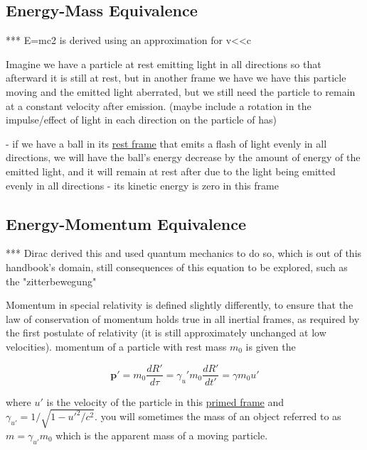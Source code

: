 \subsection{Energy-Mass Equivalence}

*** E=mc2 is derived using an approximation for v<<c

Imagine we have a particle at rest emitting light in all directions so that afterward it is still at rest, but in another frame we have we have this particle moving and the emitted light aberrated, but we still need the particle to remain at a constant velocity after emission. (maybe include a rotation in the impulse/effect of light in each direction on the particle of has)

- if we have a ball in its \hyperlink{def-proper-frame}{rest frame} that emits a flash of light evenly in all directions, we will have the ball's energy decrease by the amount of energy of the emitted light, and it will remain at rest after due to the light being emitted evenly in all directions
- its kinetic energy is zero in this frame

\subsection{Energy-Momentum Equivalence}

*** Dirac derived this and used quantum mechanics to do so, which is out of this handbook's domain, still consequences of this equation to be explored, such as the "zitterbewegung"

Momentum in special relativity is defined slightly differently, to ensure that the law of conservation of momentum holds true in all inertial frames, as required by the first postulate of relativity (it is still approximately unchanged at low velocities). momentum of a particle with rest mass $m_0$ is given the

\begin{equation}
	\mathbf{p}' = m_0 \frac{dR'}{d\tau}= \gamma_u' m_0 \frac{dR'}{dt'} = \gamma m_0 u'
\end{equation}

where $u'$ is the velocity of the particle in this \hyperlink{def-Primed-Frame}{primed frame} and $\gamma_{u'}= 1/\sqrt{1-u'^2/c^2}$. you will sometimes the mass of an object referred to as $m=\gamma_{u'} m_0$ which is the apparent mass of a moving particle.

